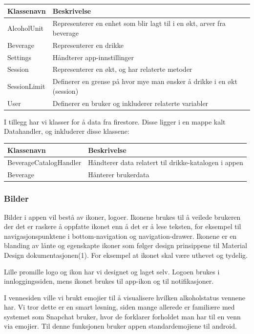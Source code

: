 \begin{tabular}{ | m{4cm} | m{12cm} | } 
    \hline
    \textbf{Klassenavn} & \textbf{Beskrivelse} \\
    \hline
    AlcoholUnit &
    Representerer en enhet som blir lagt til i en økt, arver fra beverage \\
    \hline
    Beverage &
    Representerer en drikke \\
    \hline
    Settings &
    Håndterer app-innstillinger \\
    \hline
    Session &
    Representerer en økt, og har relaterte metoder \\
    \hline
    SessionLimit &
    Definerer en grense på hvor mye man ønsker å drikke i en økt (session) \\
    \hline
    User &
    Definerer en bruker og inkluderer relaterte variabler \\
    \hline
\end{tabular}

I tillegg har vi klasser for å data fra firestore. Disse ligger i en mappe kalt Datahandler, og inkluderer disse klassene:

\begin{tabular}{ | m{4cm} | m{12cm} | } 
    \hline
    \textbf{Klassenavn} & \textbf{Beskrivelse} \\
    \hline
    BeverageCatalogHandler &
    Håndterer data relatert til drikke-katalogen i appen \\
    \hline
    Beverage &
    Hånterer brukerdata \\
    \hline
\end{tabular}

\subsubsection{Bilder}
Bilder i appen vil bestå av ikoner, logoer. Ikonene brukes til å veilede brukeren der det er raskere å oppfatte ikonet enn å det er å lese teksten, for eksempel til navigasjonspunktene i bottom-navigation og navigation-drawer. Ikonene er en blanding av lånte og egenskapte ikoner som følger design prinsippene til Material Design dokumentasjonen(1). For eksempel at ikonet skal være uthevet og tydelig.

Lille promille logo og ikon har vi designet og laget selv. Logoen brukes i innloggingssiden, mens ikonet brukes til app-ikon og til notifikasjoner.

I vennesiden ville vi brukt emojier til å visualisere hvilken alkoholstatus vennene har. Vi tror dette er en smart løsning, siden mange allerede er familiære med systemet som Snapchat bruker, hvor de forklarer forholdet man har til en venn via emojier. Til denne funksjonen bruker appen standardemojiene til android.

